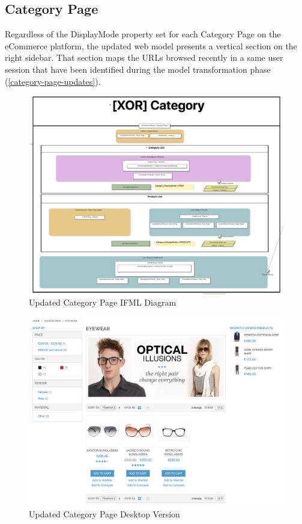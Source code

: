 \subsection{Category Page}

Regardless of the DisplayMode property set for each Category Page on the eCommerce platform, the updated web model presents a vertical section on the right sidebar. That section maps the URLs browsed recently in a same user session that have been identified during the model transformation phase (\ref{category-page-updates}).

\vspace{0.5cm}
\begin{figure}[H]
  \centering
    \includegraphics[width=14cm]{images/diagrams/after/ifml-category.png}
  \caption{Updated Category Page IFML Diagram}
  \label{fig:ifml-after-category}
\end{figure}

\begin{figure}[H]
  \centering
    \includegraphics[width=14cm]{images/diagrams/after/desktop-category.png}
  \caption{Updated Category Page Desktop Version}
  \label{fig:desktop-after-category}
\end{figure}
\vspace{0.5cm}


